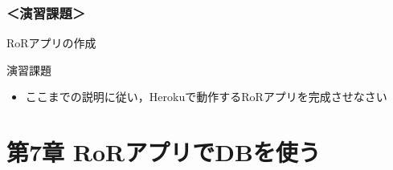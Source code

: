 \documentclass[t, aspectratio=169]{beamer}
\begin{document}
\section{＜演習課題＞}
\label{sec-6-4}
\begin{frame}[label=sec-6-4-1]{RoRアプリの作成}
\begin{block}{演習課題}
\begin{itemize}
\item ここまでの説明に従い，Herokuで動作するRoRアプリを完成させなさい
\end{itemize}
\end{block}
\end{frame}
\part{第7章 RoRアプリでDBを使う}
\label{sec-7}
\end{document}
